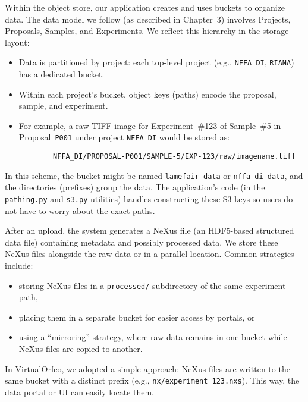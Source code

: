 \medskip

Within the object store, our application creates and uses buckets to organize 
data. The data model we follow (as described in Chapter~3) involves Projects, 
Proposals, Samples, and Experiments. We reflect this hierarchy in the storage 
layout:  

\begin{itemize}
	\item Data is partitioned by project: each top-level project 
	(e.g., \texttt{NFFA\_DI}, \texttt{RIANA}) has a dedicated bucket.  
	\item Within each project’s bucket, object keys (paths) encode the proposal, 
	sample, and experiment.  
	\item For example, a raw TIFF image for Experiment~\#123 of Sample~\#5 in 
	Proposal~\texttt{P001} under project \texttt{NFFA\_DI} would be stored as:  
	\begin{verbatim}
		NFFA_DI/PROPOSAL-P001/SAMPLE-5/EXP-123/raw/imagename.tiff
	\end{verbatim}
\end{itemize}

In this scheme, the bucket might be named \texttt{lamefair-data} or 
\texttt{nffa-di-data}, and the directories (prefixes) group the data. The 
application’s code (in the \texttt{pathing.py} and \texttt{s3.py} utilities) 
handles constructing these S3 keys so users do not have to worry about the exact 
paths.

\medskip

After an upload, the system generates a NeXus file (an HDF5-based structured data 
file) containing metadata and possibly processed data. We store these NeXus files 
alongside the raw data or in a parallel location. Common strategies include:  

\begin{itemize}
	\item storing NeXus files in a \texttt{processed/} subdirectory of the same 
	experiment path,  
	\item placing them in a separate bucket for easier access by portals, or  
	\item using a ``mirroring'' strategy, where raw data remains in one bucket 
	while NeXus files are copied to another.  
\end{itemize}

In VirtualOrfeo, we adopted a simple approach: NeXus files are written to the 
same bucket with a distinct prefix (e.g., \texttt{nx/experiment\_123.nxs}). This 
way, the data portal or UI can easily locate them.

